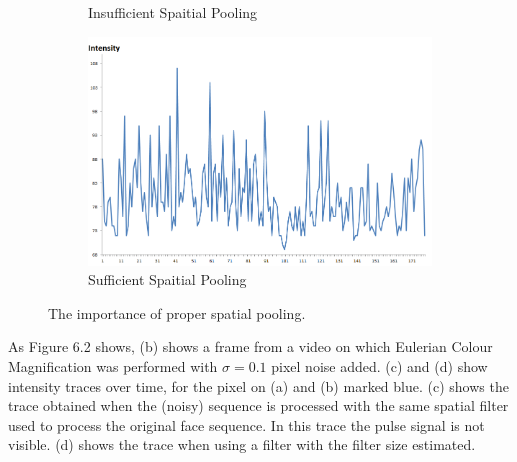 \begin{figure}
\begin{subfigure}{.45\textwidth}
  \caption{Insufficient Spaitial Pooling}
  \label{fig:sub2}%
\end{subfigure}
\begin{subfigure}{.5\textwidth}
  \centering
  \includegraphics[scale=0.23]{img/intense2}
  \caption{Sufficient Spaitial Pooling}
  \label{fig:sub2}
\end{subfigure}
\caption{The importance of proper spatial pooling.}
\label{fig:test}
\end{figure}
\newpage
As Figure 6.2 shows, (b) shows a frame from a video on which Eulerian Colour Magnification was performed with $\sigma = 0.1$ pixel noise added. (c) and (d) show intensity traces over time, for the pixel on (a) and (b) marked blue. (c) shows
the trace obtained when the (noisy) sequence is processed with the same spatial filter used
to process the original face sequence. In this trace the pulse signal is not visible. (d) shows
the trace when using a filter with the filter size estimated. 